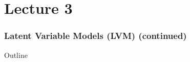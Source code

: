 \documentclass{beamer}
\begin{document}
\part{Lecture 3}

\begin{frame}
	\titlepage
	\resetonslide
\end{frame}





\section{Latent Variable Models (LVM) (continued)}

\begin{frame}{Outline}
    \tableofcontents[part=3]
\end{frame}
\end{document}
